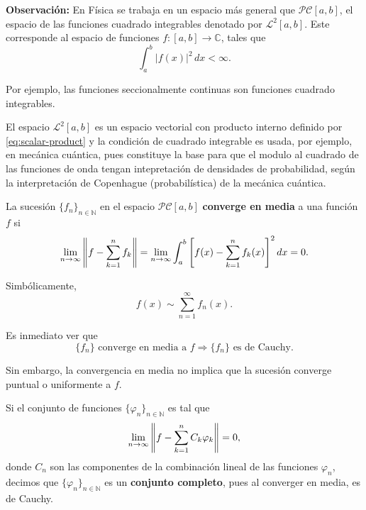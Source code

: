 \begin{shaded}
\vspace{0.1cm}
\textbf{Observación:} En Física se trabaja en un espacio más general que $\mathcal{PC}[a,b]$, el espacio de las funciones cuadrado integrables denotado por $\mathcal{L}^2[a,b]$. Este corresponde al espacio de funciones $f:[a,b] \rightarrow \mathbb{C}$, tales que 
\begin{equation}
\int_a^b |f(x)|^2 \,dx < \infty.    
\end{equation}

Por ejemplo, las funciones seccionalmente continuas son funciones cuadrado integrables.

El espacio $\mathcal{L}^2[a,b]$ es un espacio vectorial con producto interno definido por \eqref{eq:scalar-product} y la condición de cuadrado integrable es usada, por ejemplo, en mecánica cuántica, pues constituye la base para que el modulo al cuadrado de las funciones de onda tengan intepretación de densidades de probabilidad, según la interpretación de Copenhague (probabilística) de la mecánica cuántica.
\vspace{0.1cm}
\end{shaded}

La sucesión $\{f_{n}\}_{n\in \mathbb{N}}$ en el espacio $\mathcal{PC}[a,b]$ \textbf{converge en media} a una función $f$ si
\begin{equation}
    \lim_{n\to  \infty} \left\lVert f - \sum_{k=1}^{n} f_{{k}}\right\rVert = \lim_{n\to \infty} \int_a^{b} \left[ f(x) - \sum_{k=1}^{n} f_{k}(x)\right]^2 dx = 0.
\end{equation}

Simbólicamente,
\begin{equation}
    f(x) \sim  \sum_{n=1}^{\infty} f_{n}(x).
\end{equation}

Es inmediato ver que 
\begin{equation}
    \text{$\{f_{n}\}$ converge en media a $f$} \Rightarrow \text{$\{f_{n}\}$ es de Cauchy.}
\end{equation}

Sin embargo, la convergencia en media no implica que la sucesión converge puntual o uniformente a $f$.

Si el conjunto de funciones $\{\varphi_{n}\}_{n\in \mathbb{N}}$  es tal que
\begin{equation}
     \lim_{n\to  \infty} \left\lVert f - \sum_{k=1}^{n} C_{k} \varphi_{k}\right\rVert = 0,
\end{equation}
donde $C_{n}$ son las componentes de la combinación lineal de las funciones $\varphi_{n}$, decimos que $\{\varphi_{n}\}_{n\in \mathbb{N}}$ es un \textbf{conjunto completo}, pues al converger en media, es de Cauchy.

